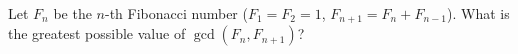 Let $F_n$ be the $n$-th Fibonacci number ($F_1=F_2=1$, $F_{n+1}=F_n+F_{n-1}$). What is the greatest possible value of $\gcd(F_n,F_{n+1})$?
